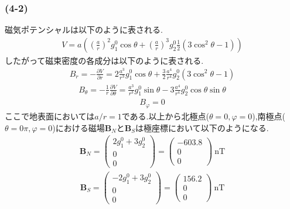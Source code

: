 \subsubsection*{(4-2)}
磁気ポテンシャルは以下のように表される.
\begin{align}
  V=a\left(\left(\frac{a}{r}\right)^2g_1^0\cos\theta+\left(\frac{a}{r}\right)^3g_2^0\frac{1}{2}(3\cos^2\theta-1)\right)
\end{align}
したがって磁束密度の各成分は以下のように表される.
\begin{align}
  B_r=-\frac{\partial V}{\partial r}=2\frac{a^3}{r^3}g_1^0\cos\theta+\frac{3}{2}\frac{a^4}{r^4}g_2^0(3\cos^2\theta-1)
\end{align}
\begin{align}
  B_\theta=-\frac{1}{r}\frac{\partial V}{\partial \theta}=\frac{a^3}{r^3}g_1^0\sin\theta-3\frac{a^4}{r^4}g_2^0\cos\theta\sin\theta
\end{align}
\begin{align}
  B_\varphi=0
\end{align}
ここで地表面においては$a/r=1$である.以上から北極点($\theta=0,\varphi=0$),南極点($\theta=0\pi,\varphi=0$)における磁場$\bm B_N$と$\bm B_S$は極座標において以下のようになる.
\begin{align}
  {\bm B_N}=\left(\begin{array}{c}
    2g_1^0+3g_2^0\\0\\0
  \end{array}\right)=\left(\begin{array}{c}
    -603.8\\0\\0
  \end{array}\right)\ \si{\nano\tesla}
\end{align}
\begin{align}
  {\bm B_S}=\left(\begin{array}{c}
    -2g_1^0+3g_2^0\\0\\0
  \end{array}\right)=\left(\begin{array}{c}
    156.2\\0\\0
  \end{array}\right)\ \si{\nano\tesla}
\end{align}
